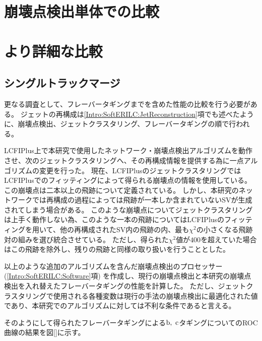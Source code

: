 \section{崩壊点検出単体での比較} \label{Com:ComparisonwithVF}

\section{より詳細な比較} \label{Com:FlavorTaggingComparison}

\subsection{シングルトラックマージ} \label{Com:FlaTagCom:SingleTrackMerge}


更なる調査として、フレーバータギングまでを含めた性能の比較を行う必要がある。
ジェットの再構成は\ref{Intro:SoftERILC:JetReconstruction}項でも述べたように、崩壊点検出、ジェットクラスタリング、フレーバータギングの順で行われる。

LCFIPlus上で本研究で使用したネットワーク・崩壊点検出アルゴリズムを動作させ、次のジェットクラスタリングへ、その再構成情報を提供する為に一点アルゴリズムの変更を行った。
現在、LCFIPlusのジェットクラスタリングではLCFIPlusでのフィッティングによって得られる崩壊点の情報を使用している。
この崩壊点は二本以上の飛跡について定義されている。
しかし、本研究のネットワークでは再構成の過程によっては飛跡が一本しか含まれていないSVが生成されてしまう場合がある。
このような崩壊点についてジェットクラスタリングは上手く動作しない為、このような一本の飛跡についてはLCFIPlusのフィッティングを用いて、他の再構成されたSV内の飛跡の内、最も$\chi^2$の小さくなる飛跡対の組みを選び統合させている。
ただし、得られた$\chi^2$値が$400$を超えていた場合はこの飛跡を除外し、残りの飛跡と同様の取り扱いを行うこととした。

以上のような追加のアルゴリズムを含んだ崩壊点検出のプロセッサー (\ref{Intro:SoftERILC:Software}項) を作成し、現行の崩壊点検出と本研究の崩壊点検出を入れ替えたフレーバータギングの性能を計算した。
ただし、ジェットクラスタリングで使用される各種変数は現行の手法の崩壊点検出に最適化された値であり、本研究でのアルゴリズムに対しては不利な条件であると言える。

そのようにして得られたフレーバータギングによる$\rm b,\ c$タギングについてのROC曲線の結果を図\ref{}に示す。


